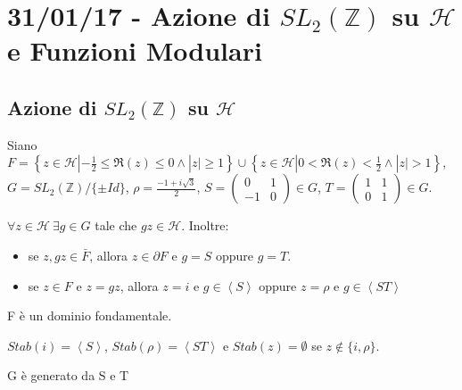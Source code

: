 \chapter{31/01/17 - Azione di $SL_2 \left( \mathbb{Z} \right)$ su $\mathcal{H}$ e Funzioni Modulari}
\justify

\section{Azione di $SL_2 \left( \mathbb{Z} \right)$ su $\mathcal{H}$}

Siano $F=\left\{z \in \mathcal{H} | -\frac{1}{2} \leq \Re(z) \leq 0
\wedge |z| \geq 1 \right\} \cup
\left\{z \in \mathcal{H} | 0 < \Re(z) < \frac{1}{2} \wedge |z| > 1 \right\}$,
$G=SL_2 \left( \mathbb{Z} \right)/\{\pm Id\}$,   $\rho=\frac{-1+i\sqrt{3}}{2}$,
$S=\left( \begin{array}{cc} 0 & 1 \\ -1 & 0 \end{array} \right) \in G$,
$T=\left( \begin{array}{cc} 1 & 1 \\ 0 & 1 \end{array} \right) \in G$.

\begin{teorema}[1]
$\forall z \in \mathcal{H} \  \exists g \in G$ tale che $gz \in \mathcal{H}$.
Inoltre:
\begin{itemize}
	\item se $z,gz \in \bar{F}$, allora $z \in \partial F$ e $g=S$ oppure $g=T$.
	\item se $z \in F$ e $z=gz$,
				allora $z=i$ e $g \in \left\langle S \right\rangle$ oppure
				$z= \rho$ e $g \in \left\langle ST \right\rangle$
\end{itemize}
\end{teorema}

\begin{corollario}
F è un dominio fondamentale.

$Stab(i)=\left\langle S \right\rangle$, 
$Stab(\rho)=\left\langle ST \right\rangle$ e $Stab(z)=\emptyset$ se 
$z \notin \{i, \rho \}$.
\end{corollario}

\begin{teorema}
G è generato da S e T
\end{teorema}


